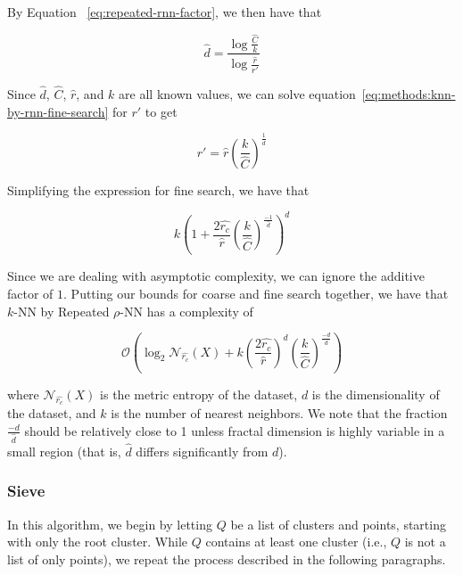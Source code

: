 By Equation ~\ref{eq:repeated-rnn-factor}, we then have that

\begin{equation*}
    \hat{d} = \frac{\log{}\frac{\hat{C}}{k}}{\log{}\frac{\hat{r}}{r'}}
\end{equation*}

Since $\hat{d}$, $\hat{C}$, $\hat{r}$, and $k$ are all known values, we can solve equation~\ref{eq:methods:knn-by-rnn-fine-search} for $r'$ to get

\begin{equation*}
    r' = \hat{r}\left(\frac{k}{\hat{C}}\right)^{\frac{1}{\hat{d}}}
\end{equation*}

Simplifying the expression for fine search, we have that

\begin{equation*}
    k\left(1+ \frac{2\hat{r_c}}{\hat{r}}\left(\frac{k}{\hat{C}}\right)^{\frac{-1}{\hat{d}}}\right)^d
\end{equation*}

Since we are dealing with asymptotic complexity, we can ignore the additive factor of $1$.
Putting our bounds for coarse and fine search together, we have that $k$-NN by Repeated $\rho$-NN has a complexity of

\begin{equation}
    \mathcal{O}\left(\log_2{\mathcal{N}_{\hat{r_c}}(X)} + k\left(\frac{2\hat{r_c}}{\hat{r}}\right)^d\left(\frac{k}{\hat{C}}\right)^{\frac{-d}{\hat{d}}}\right)
    \label{eq:methods:knn-by-rnn-complexity}
\end{equation}

where $\mathcal{N}_{\hat{r_c}}(X)$ is the metric entropy of the dataset, $d$ is the dimensionality of the dataset, and $k$ is the number of nearest neighbors.
We note that the fraction $\frac{-d}{\hat{d}}$ should be relatively close to 1 unless fractal dimension is highly variable in a small region (that is, $\hat{d}$ differs significantly from $d$).


\subsubsection{Sieve}
\label{subsubsec:methods:knn-search:sieve}

In this algorithm, we begin by letting $Q$ be a list of clusters and points, starting with only the root cluster. 
While $Q$ contains at least one cluster (i.e., $Q$ is not a list of only points), we repeat the process described in 
the following paragraphs. 

